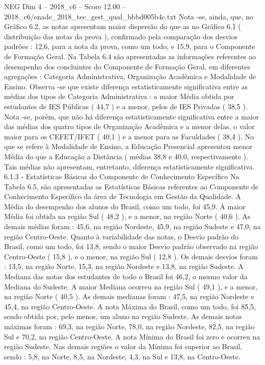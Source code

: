 \begin{textsample}{NEG Dim 4 – 2018\_c6 – Score 12.00 – 2018\_c6/enade\_2018\_tec\_gest\_qual\_bbbd005b4c.txt}
Nota -se, ainda, que, no Gráfico 6.2, as notas apresentam maior dispersão do que as no Gráfico 6.1 ( distribuição das notas da prova ), confirmado pela comparação dos desvios padrões : 12,6, para a nota da prova, como um todo, e 15,9, para o Componente de Formação Geral.
Na Tabela 6.4 são apresentadas as informações referentes ao desempenho dos concluintes do Componente de Formação Geral, em diferentes agregações : Categoria Administrativa, Organização Acadêmica e Modalidade de Ensino.
Observa -se que existe diferença estatisticamente significativa entre as médias dos tipos de Categoria Administrativa : a maior Média obtida por estudantes de IES Públicas ( 44,7 ) e a menor, pelos de IES Privadas ( 38,5 ).
Nota -se, porém, que não há diferença estatisticamente significativa entre a maior das médias dos quatro tipos de Organização Acadêmica e a menor delas, o valor maior para os CEFET/IFET ( 40,1 ) e a menor para as Faculdades ( 38,4 ).
No que se refere à Modalidade de Ensino, a Educação Presencial apresentou menor Média do que a Educação a Distância ( médias 38,8 e 40,0, respectivamente ).
Tais médias não apresentam, entretanto, diferença estatisticamente significativa. 6.1.3 - Estatísticas Básicas do Componente de Conhecimento Específico Na Tabela 6.5, são apresentadas as Estatísticas Básicas referentes ao Componente de Conhecimento Específico da área de Tecnologia em Gestão da Qualidade.
A Média do desempenho dos alunos do Brasil, como um todo, foi 45,9.
A maior Média foi obtida na região Sul ( 48,2 ), e a menor, na região Norte ( 40,6 ).
As demais médias foram : 45,6, na região Nordeste, 45,9, na região Sudeste e 47,0, na região Centro-Oeste.
Quanto à variabilidade das notas, o Desvio padrão do Brasil, como um todo, foi 13,8, sendo o maior Desvio padrão observado na região Centro-Oeste ( 15,8 ), e o menor, na região Sul ( 12,8 ).
Os demais desvios foram : 13,5, na região Norte, 15,3, na região Nordeste e 13,8, na região Sudeste.
A Mediana das notas dos estudantes de todo o Brasil foi 46,2, o mesmo valor da Mediana do Sudeste.
A maior Mediana ocorreu na região Sul ( 49,1 ), e a menor, na região Norte ( 40,5 ).
As demais medianas foram : 47,5, na região Nordeste e 45,4, na região Centro-Oeste.
A nota Máxima do Brasil, como um todo, foi 85,5, sendo obtida por, pelo menos, um aluno na região Sudeste.
As demais notas máximas foram : 69,3, na região Norte, 78,0, na região Nordeste, 82,5, na região Sul e 70,2, na região Centro-Oeste.
A nota Mínima do Brasil foi zero e ocorreu na região Sudeste.
Nas demais regiões o valor da Mínima foi superior ao Brasil, sendo : 5,8, na Norte, 8,5, na Nordeste, 4,3, na Sul e 13,8, na Centro-Oeste.

\end{textsample}
